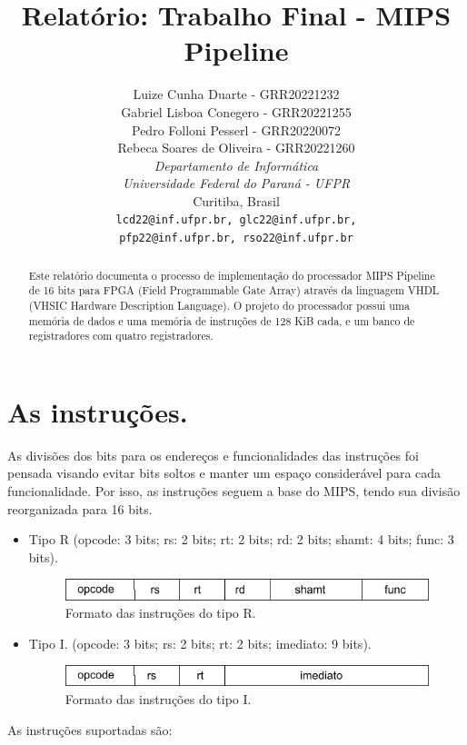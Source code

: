 \documentclass[a4paper, 11pt]{article}
\title{Relatório: Trabalho Final - MIPS Pipeline}
\author{Luize Cunha Duarte - GRR20221232\\
    Gabriel Lisboa Conegero - GRR20221255\\
    Pedro Folloni Pesserl - GRR20220072\\
    Rebeca Soares de Oliveira - GRR20221260\\
\textit{Departamento de Informática}\\
\textit{Universidade Federal do Paraná - UFPR}\\
Curitiba, Brasil\\
\texttt{lcd22@inf.ufpr.br, glc22@inf.ufpr.br,}\\
\texttt{pfp22@inf.ufpr.br, rso22@inf.ufpr.br}}
\date{}
\begin{document}
\maketitle

\begin{abstract}
\begin{singlespace}
Este relatório documenta o processo de implementação do processador MIPS Pipeline de 16
bits para FPGA (Field Programmable Gate Array) através da linguagem VHDL (VHSIC Hardware
Description Language). O projeto do processador possui uma memória de dados e uma
memória de instruções de 128 KiB cada, e um banco de registradores com quatro
registradores. 
\end{singlespace}
\end{abstract}

\section{As instruções.}
As divisões dos bits para os endereços e funcionalidades das instruções foi pensada
visando evitar bits soltos e manter um espaço considerável para cada funcionalidade.
Por isso, as instruções seguem a base do MIPS, tendo sua divisão reorganizada para
16 bits.
\begin{itemize}
    \item Tipo R (opcode: 3 bits; rs: 2 bits; rt: 2 bits; rd: 2 bits; shamt: 4 bits;
        func: 3 bits).
        \begin{figure}[h]
        \centering
        \includegraphics[width=.6\textwidth]{tipo-r.png}
        \caption{Formato das instruções do tipo R.}
        \end{figure}

    \item Tipo I. (opcode: 3 bits; rs: 2 bits; rt: 2 bits; imediato: 9 bits).
        \begin{figure}[h]
        \centering
        \includegraphics[width=.6\textwidth]{tipo-i.png}
        \caption{Formato das instruções do tipo I.}
        \end{figure}
\end{itemize}
As instruções suportadas são:
\end{document}
